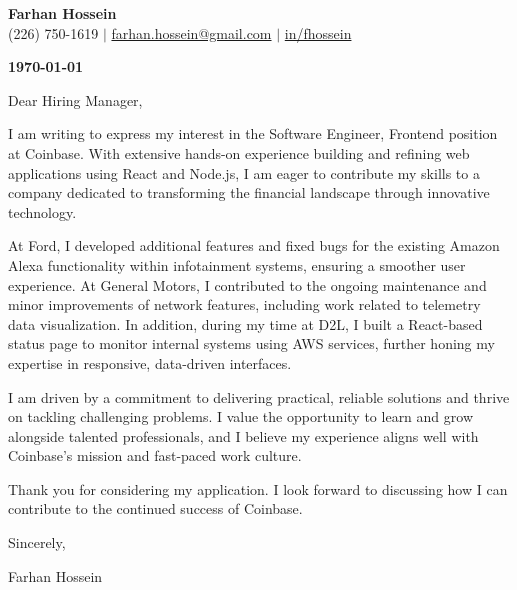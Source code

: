 \documentclass[a4paper,12pt]{article}
\begin{document}
\begin{center}
    {\Large \textbf{Farhan Hossein}}\\
    (226) 750-1619 \quad $\vert$ \quad \href{mailto:farhan.hossein@gmail.com}{farhan.hossein@gmail.com} \quad $\vert$ \quad \href{https://linkedin.com/in/fhossein}{in/fhossein}
\end{center}

\vspace{1em}

\textbf{\today}

\vspace{1em}

Dear Hiring Manager,

I am writing to express my interest in the Software Engineer, Frontend position at Coinbase. With extensive hands-on experience building and refining web applications using React and Node.js, I am eager to contribute my skills to a company dedicated to transforming the financial landscape through innovative technology.

At Ford, I developed additional features and fixed bugs for the existing Amazon Alexa functionality within infotainment systems, ensuring a smoother user experience. At General Motors, I contributed to the ongoing maintenance and minor improvements of network features, including work related to telemetry data visualization. In addition, during my time at D2L, I built a React-based status page to monitor internal systems using AWS services, further honing my expertise in responsive, data-driven interfaces.

I am driven by a commitment to delivering practical, reliable solutions and thrive on tackling challenging problems. I value the opportunity to learn and grow alongside talented professionals, and I believe my experience aligns well with Coinbase's mission and fast-paced work culture.

Thank you for considering my application. I look forward to discussing how I can contribute to the continued success of Coinbase.

Sincerely,

Farhan Hossein
\end{document}
